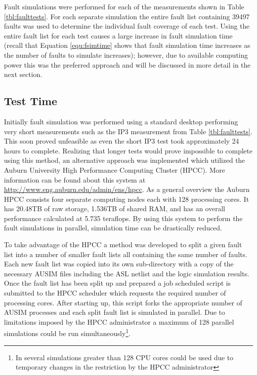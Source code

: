 \documentclass[12pt]{report}
\begin{document}
Fault simulations were performed for each of the measurements shown in Table \ref{tbl:faulttests}.  For each separate simulation the entire fault list containing 39497 faults was used to determine the individual fault coverage of each test.  Using the entire fault list for each test causes a large increase in fault simulation time (recall that Equation \ref{equ:fsimtime} shows that fault simulation time increases as the number of faults to simulate increases); however, due to available computing power this was the preferred approach and will be discussed in more detail in the next section.

\subsection{Test Time}
Initially fault simulation was performed using a standard desktop performing very short measurements such as the IP3 measurement from Table \ref{tbl:faulttests}.  This soon proved unfeasible as even the short IP3 test took approximately 24 hours to complete.  Realizing that longer tests would prove impossible to complete using this method, an alternative approach was implemented which utilized the Auburn University High Performance Computing Cluster (HPCC).  More information can be found about this system at \url{http://www.eng.auburn.edu/admin/ens/hpcc}.  As a general overview the Auburn HPCC consists four separate computing nodes each with 128 processing cores.  It has 20.48TB of raw storage, 1.536TB of shared RAM, and has an overall performance calculated at 5.735 teraflops.  By using this system to perform the fault simulations in parallel, simulation time can be drastically reduced.

To take advantage of the HPCC a method was developed to split a given fault list into a number of smaller fault lists all containing the same number of faults.  Each new fault list was copied into its own sub-directory with a copy of the necessary AUSIM files including the ASL netlist and the logic simulation results.  Once the fault list has been split up and prepared a job scheduled script is submitted to the HPCC scheduler which requests the required number of processing cores.  After starting up, this script forks the appropriate number of AUSIM processes and each split fault list is simulated in parallel.  Due to limitations imposed by the HPCC administrator a maximum of 128 parallel simulations could be run simultaneously\footnote{In several simulations greater than 128 CPU cores could be used due to temporary changes in the restriction by the HPCC administrator}.  
\end{document}
